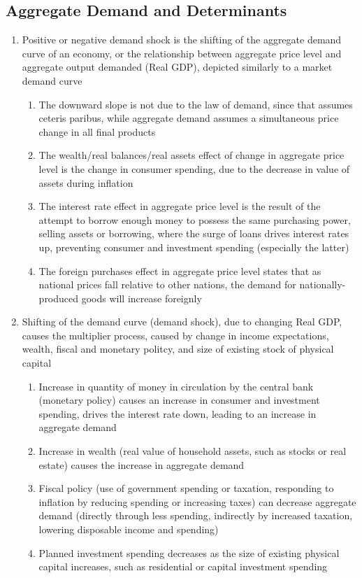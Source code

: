 \documentclass[11 pt, twoside]{article}
\begin{document}
\subsection{Aggregate Demand and Determinants}
\begin{enumerate}
\item Positive or negative demand shock is the shifting of the aggregate demand curve of an economy, or the relationship between aggregate price level and aggregate output demanded (Real GDP), depicted similarly to a market demand curve
\begin{enumerate}
\item The downward slope is not due to the law of demand, since that assumes ceteris paribus, while aggregate demand assumes a simultaneous price change in all final products
\item The wealth/real balances/real assets effect of change in aggregate price level is the change in consumer spending, due to the decrease in value of assets during inflation
\item The interest rate effect in aggregate price level is the result of the attempt to borrow enough money to possess the same purchasing power, selling assets or borrowing, where the surge of loans drives interest rates up, preventing consumer and investment spending (especially the latter)
\item The foreign purchases effect in aggregate price level states that as national prices fall relative to other nations, the demand for nationally-produced goods will increase foreignly
\end{enumerate}
\item Shifting of the demand curve (demand shock), due to changing Real GDP, causes the multiplier process, caused by change in income expectations, wealth, fiscal and monetary politcy, and size of existing stock of physical capital
\begin{enumerate}
\item Increase in quantity of money in circulation by the central bank (monetary policy) causes an increase in consumer and investment spending, drives the interest rate down, leading to an increase in aggregate demand
\item Increase in wealth (real value of household assets, such as stocks or real estate) causes the increase in aggregate demand
\item Fiscal policy (use of government spending or taxation, responding to inflation by reducing spending or increasing taxes) can decrease aggregate demand (directly through less spending, indirectly by increased taxation, lowering disposable income and spending)
\item Planned investment spending decreases as the size of existing physical capital increases, such as residential or capital investment spending
\end{enumerate}
\end{enumerate}
\end{document}

